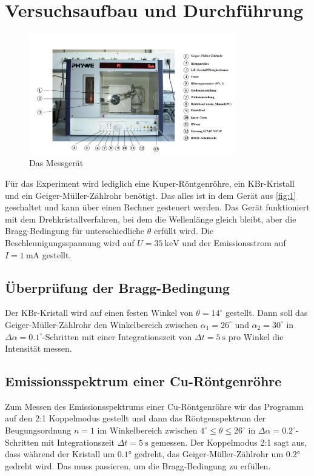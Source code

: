 \section{Versuchsaufbau und Durchführung}
\begin{figure}[H]
\centering
  \includegraphics[width=9cm]{content/1.png}
  \caption{Das Messgerät}
  \label{fig:1}
\end{figure}
Für das Experiment wird lediglich eine Kuper-Röntgenröhre, ein KBr-Kristall und ein Geiger-Müller-Zählrohr benötigt. Das alles ist in dem Gerät aus \autoref{fig:1} geschaltet und kann über einen Rechner gesteuert werden. Das Gerät funktioniert mit dem Drehkristallverfahren, bei dem die Wellenlänge gleich bleibt, aber die Bragg-Bedingung für unterschiedliche $\theta$ erfüllt wird. Die Beschleunigungsspannung wird auf $U=35\ \si{\keV}$ und der Emissionsstrom auf $I=1\ \si{\mA}$ gestellt.

\subsection{Überprüfung der Bragg-Bedingung}
Der KBr-Kristall wird auf einen festen Winkel von $\theta=14^{\circ}$ gestellt. Dann soll das Geiger-Müller-Zählrohr den Winkelbereich zwischen $\alpha_{1}=26^{\circ}$ und $\alpha_{2}=30^{\circ}$ in $\Delta\alpha=0.1^{\circ}$-Schritten mit einer Integrationszeit von $\Delta t=5\ \si{\s}$ pro Winkel die Intensität messen.

\subsection{Emissionsspektrum einer Cu-Röntgenröhre}
Zum Messen des Emissionsspektrums einer Cu-Röntgenröhre wir das Programm auf den 2:1 Koppelmodus gestellt und dann das Röntgenspektrum der Beugungsordnung $n=1$ im Winkelbereich zwischen $4^{\circ}\leq\theta\leq 26^{\circ}$ in $\Delta\alpha=0.2^{\circ}$-Schritten mit Integrationszeit $\Delta t=5\ \si{\s}$ gemessen. Der Koppelmodus 2:1 sagt aus, dass während der Kristall um $0.1$° gedreht, das Geiger-Müller-Zählrohr um $0.2$° gedreht wird. Das muss passieren, um die Bragg-Bedingung zu erfüllen. 


